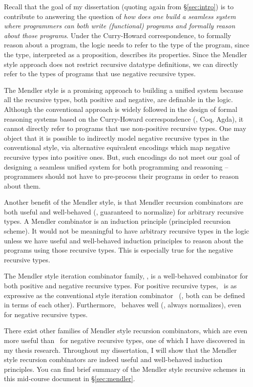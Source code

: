 Recall that the goal of my dissertation (quoting again from \S\ref{sec:intro})
is to contribute to answering the question of {\em how does one build a
seamless system where programmers can both write (functional) programs and
formally reason about those programs}. Under the Curry-Howard correspondence,
to formally reason about a program, the logic needs to refer to the type of
the program, since the type, interpreted as a proposition, describes its
properties. Since the Mendler style approach does not restrict recursive
datatype definitions, we can directly refer to the types of programs that use
negative recursive types.

The Mendler style is a promising approach to building a unified system because
all the recursive types, both positive and negative, are definable in the
logic. Although the conventional approach is widely followed in the design of
formal reasoning systems based on the Curry-Howard correspondence (\eg, Coq,
Agda), it cannot directly refer to programs that use non-positive recursive
types. One may object that it is possible to indirectly model negative
recursive types in the conventional style, via alternative equivalent
encodings which map negative recursive types into positive ones. But, such
encodings do not meet our goal of designing a seamless unified system for both
programming and reasoning -- programmers should not have to pre-process their
programs in order to reason about them.

Another benefit of the Mendler style, is that Mendler recursion combinators
are both useful and well-behaved (\ie, guaranteed to normalize) for arbitrary
recursive types. A Mendler combinator is an induction principle
(principled recursion scheme). It would not be meaningful to have
arbitrary recursive types in the logic unless we have useful and well-behaved
induction principles to reason about the programs using those recursive types.
This is especially true for the negative recursive types.

The Mendler style iteration combinator family, \MIt, is a well-behaved
combinator for both positive and negative recursive types.
For positive recursive types, \MIt\ is as expressive as the conventional style
iteration combinator \It\ (\ie, both can be defined in terms of each other). 
Furthermore, \MIt\ behaves well (\ie, always normalizes), even for negative
recursive types.

There exist other families of Mendler style recursion combinators,
which are even more useful than \MIt\ for negative recursive types,
one of which I have discovered in my thesis research. Throughout
my dissertation, I will show that the Mendler style recursion combinators are
indeed useful and well-behaved induction principles. You can find brief
summary of the Mendler style recursive schemes in this mid-course document
in \S\ref{sec:mendler}.


